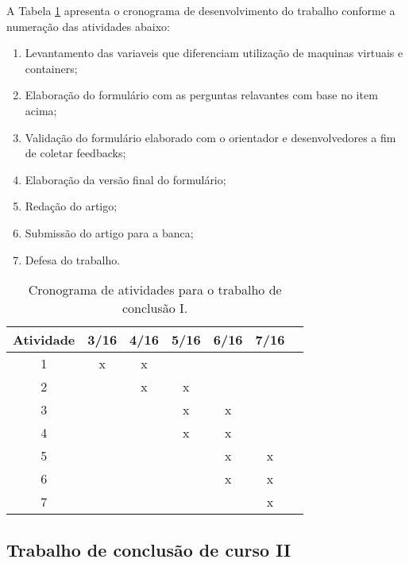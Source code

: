 \documentclass[11pt,a4paper]{article}
\begin{document}
A Tabela \ref{tab:cronograma1} apresenta o cronograma de desenvolvimento do trabalho conforme a numeração das atividades abaixo:
\begin{enumerate}
  \item Levantamento das variaveis que diferenciam utilização de maquinas virtuais e containers;
  \item Elaboração do formulário com as perguntas relavantes com base no item acima;
  \item Validação do formulário elaborado com o orientador e desenvolvedores a fim de coletar feedbacks;
  \item Elaboração da versão final do formulário;
  \item Redação do artigo;
  \item Submissão do artigo para a banca;
  \item Defesa do trabalho.
\end{enumerate}

\begin{table}[h]
  \begin{center}
    \caption{Cronograma de atividades para o trabalho de conclusão I. \label{tab:cronograma1}}
    \begin{tabular}{|c|c|c|c|c|c|c|}
      \hline
      \bf Atividade & \bf 3/16 & \bf 4/16 & \bf 5/16 & \bf 6/16 & \bf 7/16 \\  \hline \hline
      1 & x & x &   &   &   \\ \hline
      2 &   & x & x &   &   \\ \hline
      3 &   &   & x & x &   \\ \hline
      4 &   &   & x & x &   \\ \hline
      5 &   &   &   & x & x \\ \hline
      6 &   &   &   & x & x \\ \hline
      7 &   &   &   &   & x \\ \hline
    \end{tabular}
  \end{center}
\end{table}

\subsection{Trabalho de conclusão de curso II}
\end{document}
